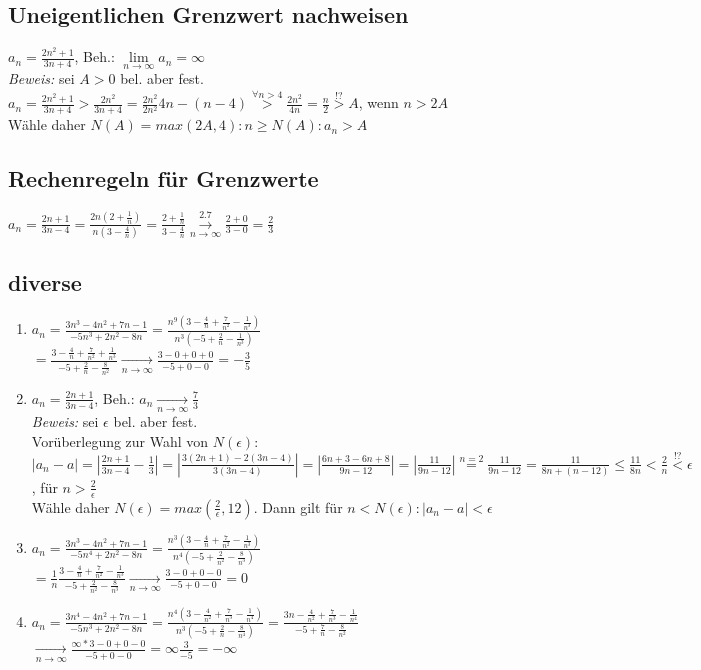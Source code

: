\documentclass[a4paper,11pt]{article}
\begin{document}
\subsection{Uneigentlichen Grenzwert nachweisen}
$a_n=\frac{2n^2+1}{3n+4}$, Beh.: $\underset{n\to\infty}{\lim}a_n=\infty$\\
\emph{Beweis:} sei $A>0$ bel. aber fest.\\
$a_n=\frac{2n^2+1}{3n+4}>\frac{2n^2}{3n+4}=\frac{2n^2}{2n^2}{4n-(n-4)}\overset{\forall n>4}{>}\frac{2n^2}{4n}=\frac{n}{2}\overset{!?}{>}A$, wenn $n>2A$\\
Wähle daher $N(A)=max(2A, 4): n\geq N(A):a_n>A$
\subsection{Rechenregeln für Grenzwerte}
$a_n=\frac{2n+1}{3n-4}=\frac{2n(2+\frac{1}{n})}{n(3-\frac{4}{n})}=\frac{2+\frac{1}{n}}{3-\frac{4}{n}}\overset{2.7}{\underset{n\to\infty}{\to}}\frac{2+0}{3-0}=\frac{2}{3}$
\subsection{diverse}
\begin{enumerate}[label={\alph*)}]
	\item $a_n=\frac{3n^3-4n^2+7n-1}{-5n^3+2n^2-8n}=\frac{n^9(3-\frac{4}{n}+\frac{7}{n^2}-\frac{1}{n^3})}{n^3(-5+\frac{2}{n}-\frac{1}{n^3})}$\\
		$=\frac{3-\frac{4}{n}+\frac{7}{n^2}+\frac{1}{n^3}}{-5+\frac{2}{n}-\frac{8}{n^2}}\underset{n\to\infty}{\to}\frac{3-0+0+0}{-5+0-0}=-\frac{3}{5}$
	\item $a_n=\frac{2n+1}{3n-4}$, Beh.: $a_n\underset{n\to\infty}{\to}\frac{7}{3}$\\
		\emph{Beweis:} sei $\epsilon$ bel. aber fest.\\
		Vorüberlegung zur Wahl von $N(\epsilon)$:\\
		$|a_n-a|=|\frac{2n+1}{3n-4}-\frac{1}{3}|=|\frac{3(2n+1)-2(3n-4)}{3(3n-4)}|=|\frac{6n+3-6n+8}{9n-12}|=|\frac{11}{9n-12}|\overset{n=2}{=}\frac{11}{9n-12}=\frac{11}{8n+(n-12)}\leq\frac{11}{8n}<\frac{2}{n}\overset{!?}{<}\epsilon$, für $n>\frac{2}{\epsilon}$\\
		Wähle daher $N(\epsilon)=max(\frac{2}{\epsilon},12)$.
		Dann gilt für $n<N(\epsilon):|a_n-a|<\epsilon$
	\item $a_n=\frac{3n^3-4n^2+7n-1}{-5n^4+2n^2-8n}=\frac{n^3(3-\frac{4}{n}+\frac{7}{n^2}-\frac{1}{n^3})}{n^4(-5+\frac{2}{n^2}-\frac{8}{n^3})}$\\
		$=\frac{1}{n}\frac{3-\frac{4}{n}+\frac{7}{n^2}-\frac{1}{n^3}}{-5+\frac{2}{n^2}-\frac{8}{n^3}}\underset{n\to\infty}{\to}\frac{3-0+0-0}{-5+0-0}=0$
	\item $a_n=\frac{3n^4-4n^2+7n-1}{-5n^3+2n^2-8n}=\frac{n^4(3-\frac{4}{n^2}+\frac{7}{n^3}-\frac{1}{n^4})}{n^3(-5+\frac{2}{n}-\frac{8}{n^4})}=\frac{3n-\frac{4}{n^2}+\frac{7}{n^3}-\frac{1}{n^4}}{-5+\frac{7}{n}-\frac{8}{n^2}}$\\
		$\underset{n\to\infty}{\to}\frac{\infty*3-0+0-0}{-5+0-0}=\infty\frac{3}{-5}=-\infty$
\end{enumerate}
\end{document}
